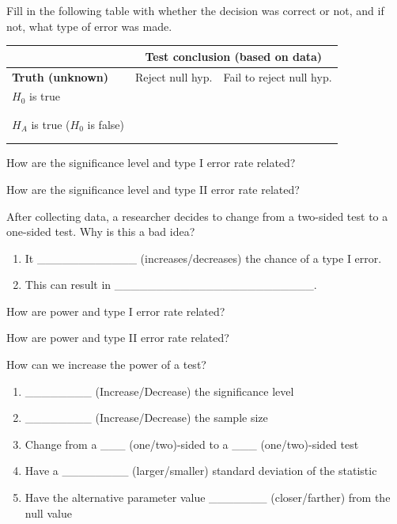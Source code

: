 \documentclass[
]{report}
\newcommand{\rgs}{\vspace{12pt}} %
\begin{document}
Fill in the following table with whether the decision was correct or not, and if not, what type of error was made.

\begin{center}
\begin{tabular}{|p{2in}|p{2in}|p{2in}|}
\hline
 & \multicolumn{2}{|c|}{\textbf{Test conclusion (based on data)}} \\ \hline
 \textbf{Truth (unknown)} & Reject null hyp. & Fail to reject null hyp. \\ \hline
 $H_0$ is true && \\ 
   & & \\ 
   & & \\ \hline
 $H_A$ is true ($H_0$ is false)  && \\ 
   & & \\ 
   & & \\ \hline
\end{tabular}
\end{center}

\rgs

How are the significance level and type I error rate related?
\rgs

How are the significance level and type II error rate related?
\rgs

After collecting data, a researcher decides to change from a two-sided test to a one-sided test. Why is this a bad idea?

\begin{enumerate}
\def\labelenumi{\arabic{enumi}.}
\item
  It \_\_\_\_\_\_\_\_\_\_\_\_ (increases/decreases) the chance of a type I error.
\item
  This can result in \_\_\_\_\_\_\_\_\_\_\_\_\_\_\_\_\_\_\_\_\_\_\_\_.
  \rgs
\end{enumerate}

How are power and type I error rate related?
\rgs

How are power and type II error rate related?
\rgs

How can we increase the power of a test?

\begin{enumerate}
\def\labelenumi{\arabic{enumi}.}
\item
  \_\_\_\_\_\_\_\_ (Increase/Decrease) the significance level
  \rgs
\item
  \_\_\_\_\_\_\_\_ (Increase/Decrease) the sample size
  \rgs
\item
  Change from a \_\_\_ (one/two)-sided to a \_\_\_ (one/two)-sided test
  \rgs
\item
  Have a \_\_\_\_\_\_\_\_ (larger/smaller) standard deviation of the statistic
  \rgs
\item
  Have the alternative parameter value \_\_\_\_\_\_\_ (closer/farther) from the null value
  \rgs
\end{enumerate}
\end{document}
